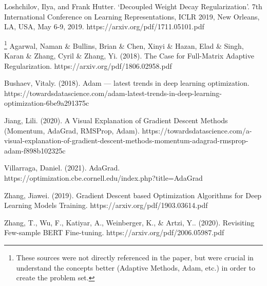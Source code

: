  Loshchilov, Ilya, and Frank Hutter. ‘Decoupled Weight Decay Regularization’. 7th International Conference on Learning Representations, ICLR 2019, New Orleans, LA, USA, May 6-9, 2019. https://arxiv.org/pdf/1711.05101.pdf

 \footnote[1]{\label{note1}These sources were not directly referenced in the paper, but were crucial in understand the concepts better (Adaptive Methods, Adam, etc.) in order to create the problem set.} \hspace{-6mm} Agarwal, Naman \& Bullins, Brian \& Chen, Xinyi \& Hazan, Elad \& Singh, Karan \& Zhang, Cyril \& Zhang, Yi. (2018). The Case for Full-Matrix Adaptive Regularization. https://arxiv.org/pdf/1806.02958.pdf

 \footnotemark[\ref{note1}]Bushaev, Vitaly. (2018). Adam — latest trends in deep learning optimization. https://towardsdatascience.com/adam-latest-trends-in-deep-learning-optimization-6be9a291375c

 \footnotemark[\ref{note1}]Jiang, Lili. (2020). A Visual Explanation of Gradient Descent Methods (Momentum, AdaGrad, RMSProp, Adam). https://towardsdatascience.com/a-visual-explanation-of-gradient-descent-methods-momentum-adagrad-rmsprop-adam-f898b102325c

 \footnotemark[\ref{note1}]Villarraga, Daniel. (2021). AdaGrad. https://optimization.cbe.cornell.edu/index.php?title=AdaGrad

 \footnotemark[\ref{note1}]Zhang, Jiawei. (2019). Gradient Descent based Optimization Algorithms for Deep Learning Models Training. https://arxiv.org/pdf/1903.03614.pdf

 \footnotemark[\ref{note1}]Zhang, T., Wu, F., Katiyar, A., Weinberger, K., & Artzi, Y.. (2020). Revisiting Few-sample BERT Fine-tuning. https://arxiv.org/pdf/2006.05987.pdf